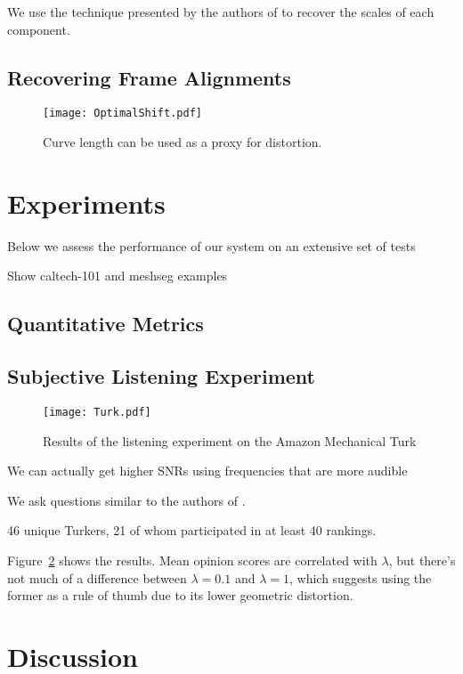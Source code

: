 \documentclass[runningheads]{llncs}
\begin{document}
We use the technique presented by the authors of \cite{xiaoxiao_dong_data_2004} to recover the scales of each component.

\subsection{Recovering Frame Alignments}


\begin{figure}
  \centering
  \texttt{[image: OptimalShift.pdf]}
  \caption{Curve length can be used as a proxy for distortion.}
  \label{fig:TSPTour}
\end{figure}



\section{Experiments}
\label{sec:experiments}

Below we assess the performance of our system on an extensive set of tests

Show caltech-101 and meshseg examples

\subsection{Quantitative Metrics}

\subsection{Subjective Listening Experiment}

\begin{figure}
  \centering
  \texttt{[image: Turk.pdf]}
  \caption{Results of the listening experiment on the Amazon Mechanical Turk}
  \label{fig:TurkResults}
\end{figure}


We can actually get higher SNRs using frequencies that are more audible

We ask questions similar to the authors of \cite{bassia2001robust}.

46 unique Turkers, 21 of whom participated in at least 40 rankings.

Figure~\ref{fig:TurkResults} shows the results.  Mean opinion scores are correlated with $\lambda$, but there's not much of a difference between $\lambda=0.1$ and $\lambda=1$, which suggests using the former as a rule of thumb due to its lower geometric distortion.

\section{Discussion}

%
%
%


%
\end{document}
